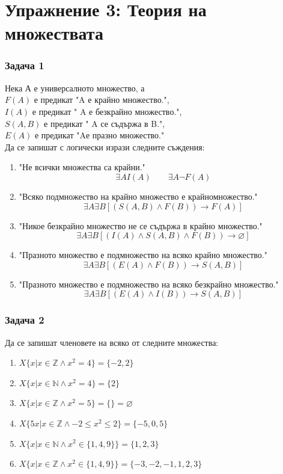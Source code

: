\documentclass[fleqn, 12pt]{article}
\theoremstyle{definition}
\begin{document}
\section{Упражнение 3: Теория на множествата}

\subsubsection*{Задача 1}
Нека А е универсалното множество, а\\
$F(A)$ е предикат "A е крайно множество.",  \\
$I(A)$ е предикат " A е безкрайно множество.", \\
$S(A, B)$ е предикат " A се съдържа в B.", \\
$E(A)$ е предикат "Aе празно множество."  \\
Да се запишат с логически изрази следните съждения:\\
\begin{enumerate}
\item "Не всички множества са крайни."
$$\exists A I(A) \qquad \exists A \neg F(A)$$
\item "Всяко подмножество на крайно множество е крайномножество." 
$$\exists A \exists B [(S(A,B) \land F(B)) \to F(A)]$$
\item "Никое безкрайно множество не се съдържа в крайно множество."
$$\exists A \exists B [(I(A) \land S(A,B) \land F(B)) \to \varnothing]$$
\item "Празното множество е подмножество на всяко крайно множество." 
$$\exists A \exists B [(E(A) \land F(B)) \to S(A,B)]$$
\item "Празното множество е подмножество на всяко безкрайно множество."
$$\exists A \exists B [(E(A) \land I(B)) \to S(A,B)]$$
\end{enumerate}

\subsubsection*{Задача 2}
Да се запишат членовете на всяко от следните множества:
\begin{enumerate}
\item $X\{x \vert x \in \mathbb{Z} \land x^2 = 4 \} = \{-2,2\}$
\item $X\{x \vert x \in \mathbb{N} \land x^2 = 4 \} = \{2\}$
\item $X\{x \vert x \in \mathbb{Z} \land x^2 = 5 \} = \{\} = \varnothing$
\item $X\{5x \vert x \in \mathbb{Z} \land -2 \leq x^2 \leq 2\} = \{-5,0,5\}$
\item $X\{x \vert x \in \mathbb{N} \land x^2 \in \{1, 4, 9\} \} = \{ 1,2,3\}$
\item $X\{x \vert x \in \mathbb{Z} \land x^2 \in \{1, 4, 9\} \} = \{ -3,-2,-1,1,2,3\}$
\end{enumerate}
\end{document}
